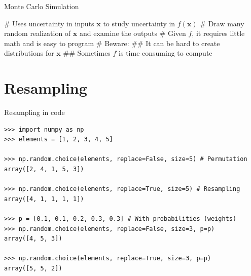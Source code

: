\documentclass[12pt, aspectratio=149]{beamer}
\theoremstyle{plain}
\begin{document}
\begin{frame}[fragile]{Monte Carlo Simulation}
	
	\begin{easylist}[itemize]
		# Uses uncertainty in inputs $\mathbf{x}$ to study uncertainty in $f(\mathbf{x})$
		# Draw many random realization of $\mathbf{x}$ and examine the outputs
		# Given $f$, it requires little math and is easy to program
		# Beware:
		## It can be hard to create distributions for $\mathbf{x}$
		## Sometimes $f$ is time consuming to compute
	\end{easylist}
\end{frame}

\section{Resampling}

\begin{frame}[fragile]{Resampling in code}
\begin{center}
\begin{verbatim} 
>>> import numpy as np
>>> elements = [1, 2, 3, 4, 5]

>>> np.random.choice(elements, replace=False, size=5) # Permutation
array([2, 4, 1, 5, 3])

>>> np.random.choice(elements, replace=True, size=5) # Resampling
array([4, 1, 1, 1, 1])

>>> p = [0.1, 0.1, 0.2, 0.3, 0.3] # With probabilities (weights)
>>> np.random.choice(elements, replace=False, size=3, p=p)
array([4, 5, 3])

>>> np.random.choice(elements, replace=True, size=3, p=p)
array([5, 5, 2])
\end{verbatim}
\end{center}
\end{frame}
\end{document}
